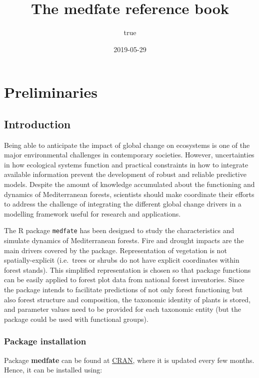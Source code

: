 \documentclass[]{book}
\title{The medfate reference book}
\author{true}
\date{2019-05-29}
\begin{document}
\maketitle

{
\setcounter{tocdepth}{1}
\tableofcontents
}
\hypertarget{part-preliminaries}{%
\part{Preliminaries}\label{part-preliminaries}}

\hypertarget{intro}{%
\chapter{Introduction}\label{intro}}

Being able to anticipate the impact of global change on ecosystems is one of the major environmental challenges in contemporary societies. However, uncertainties in how ecological systems function and practical constraints in how to integrate available information prevent the development of robust and reliable predictive models. Despite the amount of knowledge accumulated about the functioning and dynamics of Mediterranean forests, scientists should make coordinate their efforts to address the challenge of integrating the different global change drivers in a modelling framework useful for research and applications.

The R package \texttt{medfate} has been designed to study the characteristics and simulate dynamics of Mediterranean forests. Fire and drought impacts are the main drivers covered by the package. Representation of vegetation is not spatially-explicit (i.e.~trees or shrubs do not have explicit coordinates within forest stands). This simplified representation is chosen so that package functions can be easily applied to forest plot data from national forest inventories. Since the package intends to facilitate predictions of not only forest functioning but also forest structure and composition, the taxonomic identity of plants is stored, and parameter values need to be provided for each taxonomic entity (but the package could be used with functional groups).

\hypertarget{package-installation}{%
\section{Package installation}\label{package-installation}}

Package \textbf{medfate} can be found at \href{https://CRAN.R-project.org/package=medfate}{CRAN}, where it is updated every few months. Hence, it can be installed using:
\end{document}
